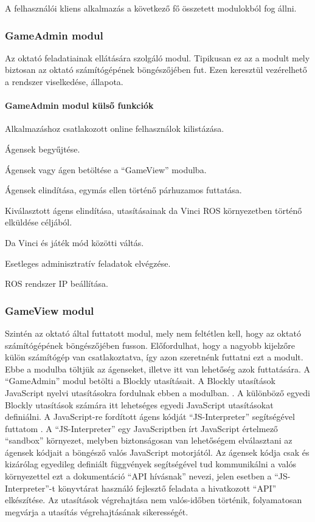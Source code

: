\documentclass[12pt,a4paper,oneside]{report} %
\begin{document}
\par A felhasználói kliens alkalmazás a következő fő összetett modulokból fog állni.
\subsubsection{GameAdmin modul}
Az oktató feladatiainak ellátására szolgáló modul. Tipikusan ez az a modult mely biztosan az oktató számítógépének böngészőjében fut.
Ezen keresztül vezérelhető a rendszer viselkedése, állapota.
\paragraph{GameAdmin modul külső funkciók}
\begin{compactitem}
	\item Alkalmazáshoz csatlakozott online felhasználok kilistázása.
	\item Ágensek begyűjtése.
	\item Ágensek vagy ágen betöltése a ``GameView'' modulba.
	\item Ágensek elindítása, egymás ellen történő párhuzamos futtatása.
	\item Kiválasztott ágens elindítása, utasításainak da Vinci ROS környezetben történő elküldése céljából.
	\item Da Vinci és játék mód közötti váltás.
	\item Esetleges adminisztratív feladatok elvégzése.
	\item ROS rendszer IP beállítása.
\end{compactitem}

\subsubsection{GameView modul}
Szintén az oktató által futtatott modul, mely nem feltétlen kell, hogy az oktató számítógépének böngészőjében fusson. Előfordulhat, hogy a nagyobb kijelzőre külön számítógép van csatlakoztatva, így azon szeretnénk futtatni ezt a modult. 
Ebbe a modulba töltjük  az ágenseket, illetve itt van lehetőség azok futtatására. A ``GameAdmin'' modul betölti  a Blockly utasításait. A Blockly utasítások JavaScript nyelvi utasításokra fordulnak ebben a modulban. . A különböző egyedi Blockly utasítások számára itt lehetséges egyedi JavaScript utasításokat definiálni. A JavaScript-re fordított ágens kódját ``JS-Interpreter'' segítségével futtatom \cite{BibEntry2020Feb}. A ``JS-Interpreter'' egy JavaScriptben írt JavaScript értelmező ``sandbox'' környezet, melyben biztonságosan van lehetőségem elválasztani az ágensek kódjait a böngésző valós JavaScript motorjától. Az ágensek kódja csak és kizárólag egyedileg definiált függvények segítségével tud kommunikálni a valós környezettel ezt a dokumentáció ``API hívásnak'' nevezi, jelen esetben a ``JS-Interpreter''-t könyvtárat használó fejlesztő feladata a hivatkozott ``API'' elkészítése. Az utasítások végrehajtása nem valós-időben történik, folyamatosan megvárja a utasítás végrehajtásának sikerességét. 
\end{document}
